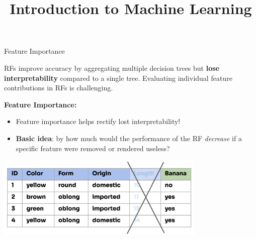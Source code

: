 \documentclass[11pt,compress,t,notes=noshow, xcolor=table]{beamer}
\title{Introduction to Machine Learning}
\begin{document}

\begin{vbframe}{Feature Importance}

RFs improve accuracy by aggregating multiple decision trees but \textbf{lose interpretability} compared to a single tree. Evaluating individual feature contributions in RFs is challenging.

\textbf{Feature Importance:}
\begin{itemize}
\item Feature importance helps rectify lost interpretability!
\item \textbf{Basic idea}: by how much would the performance of the RF \textit{decrease} if a specific feature were removed or rendered useless?
\end{itemize}

\begin{center}
\includegraphics[width=0.75\textwidth]{figure_man/forest-fimp_idea.png}
\end{center}

\end{vbframe}
\end{document}
